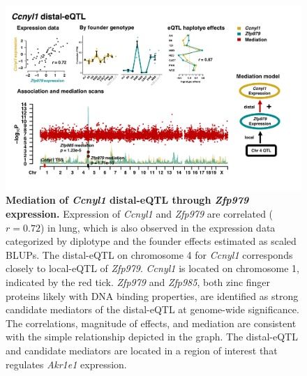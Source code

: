 \documentclass[10pt,letterpaper,twoside]{article}
\begin{document}
\begin{figure}[hp]
\renewcommand{\familydefault}{\sfdefault}\normalfont
\centering
\includegraphics[width=\textwidth, trim={0in 0.5in 0in 0in}, clip]{figs/ccnyl1_mediation.png}
\caption{\textbf{Mediation of \textit{Ccnyl1} distal-eQTL through \textit{Zfp979} expression.} 
Expression of \textit{Ccnyl1} and \textit{Zfp979} are correlated ($r = 0.72$) in lung, which is also observed in the expression data categorized by diplotype and the founder effects estimated as scaled BLUPs. The distal-eQTL on chromosome 4 for \textit{Ccnyl1} corresponds closely to local-eQTL of \textit{Zfp979}. \textit{Ccnyl1} is located on chromosome 1, indicated by the red tick. \textit{Zfp979} and \textit{Zfp985}, both zinc finger proteins likely with DNA binding properties, are identified as strong candidate mediators of the distal-eQTL at genome-wide significance. The correlations, magnitude of effects, and mediation are consistent with the simple relationship depicted in the graph. The distal-eQTL and candidate mediators are located in a region of interest that regulates \textit{Akr1e1} expression. 
\label{fig:ccnyl1_exmediation}}
\end{figure}

\clearpage
\end{document}
